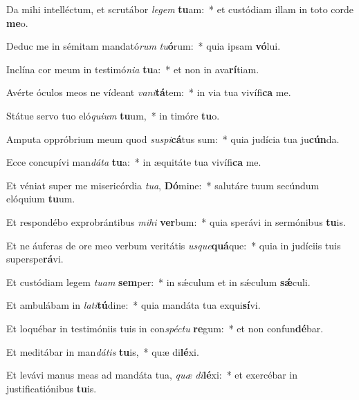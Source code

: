 \item Da mihi intelléctum, et scrutábor \textit{le}\textit{gem} \textbf{tu}am:~* et custódiam illam in toto corde \textbf{me}o.
\item Deduc me in sémitam mandató\textit{rum} \textit{tu}\textbf{ó}rum:~* quia ipsam \textbf{vó}lui.
\item Inclína cor meum in testimó\textit{ni}\textit{a} \textbf{tu}a:~* et non in ava\textbf{rí}tiam.
\item Avérte óculos meos ne vídeant \textit{va}\textit{ni}\textbf{tá}tem:~* in via tua vivífi\textbf{ca} me.
\item Státue servo tuo eló\textit{qui}\textit{um} \textbf{tu}um,~* in timóre \textbf{tu}o.
\item Amputa oppróbrium meum quod \textit{su}\textit{spi}\textbf{cá}tus sum:~* quia judícia tua ju\textbf{cún}da.
\item Ecce concupívi man\textit{dá}\textit{ta} \textbf{tu}a:~* in æquitáte tua vivífi\textbf{ca} me.
\item Et véniat super me misericórdia \textit{tu}\textit{a}, \textbf{Dó}mine:~* salutáre tuum secúndum elóquium \textbf{tu}um.
\item Et respondébo exprobrántibus \textit{mi}\textit{hi} \textbf{ver}bum:~* quia sperávi in sermónibus \textbf{tu}is.
\item Et ne áuferas de ore meo verbum veritátis \textit{us}\textit{que}\textbf{quá}que:~* quia in judíciis tuis superspe\textbf{rá}vi.
\item Et custódiam legem \textit{tu}\textit{am} \textbf{sem}per:~* in sǽculum et in sǽculum \textbf{sǽ}culi.
\item Et ambulábam in \textit{la}\textit{ti}\textbf{tú}dine:~* quia mandáta tua exqui\textbf{sí}vi.
\item Et loquébar in testimóniis tuis in con\textit{spéc}\textit{tu} \textbf{re}gum:~* et non confun\textbf{dé}bar.
\item Et meditábar in man\textit{dá}\textit{tis} \textbf{tu}is,~* quæ di\textbf{lé}xi.
\item Et levávi manus meas ad mandáta tua, \textit{quæ} \textit{di}\textbf{lé}xi:~* et exercébar in justificatiónibus \textbf{tu}is.
